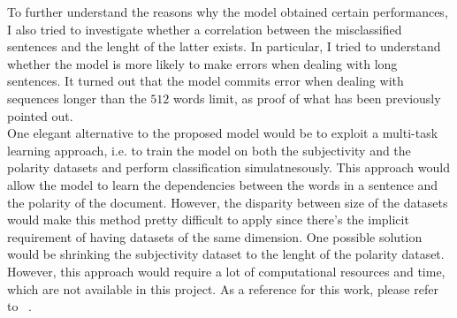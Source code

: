 To further understand the reasons why the model obtained certain performances, I also tried to investigate whether a correlation between the misclassified sentences and the 
lenght of the latter exists. In particular, I tried to understand whether the model is more likely to make errors when dealing with long sentences. It turned out that the model
commits error when dealing with sequences longer than the $512$ words limit, as proof of what has been previously pointed out.\\

One elegant alternative to the proposed model would be to exploit a multi-task learning approach, i.e. to train the model on both the subjectivity and the polarity datasets 
and perform classification simulatnesously. This approach would allow the model to learn the dependencies between the words in a sentence and the polarity of the document.
However, the disparity between size of the datasets would make this method pretty difficult to apply since there's the implicit requirement of having datasets of the same
dimension. One possible solution would be shrinking the subjectivity dataset to the lenght of the polarity dataset. However, this approach would require a lot of 
computational resources and time, which are not available in this project. As a reference for this work, please refer to ~\cite{mtl}.\\
